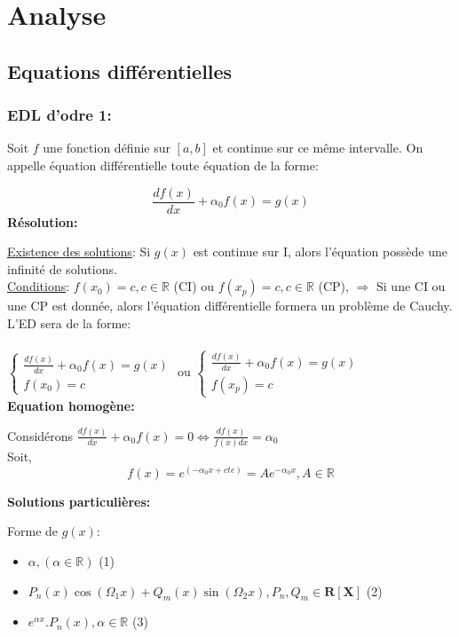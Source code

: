 \section{Analyse}
\subsection{Equations différentielles}

\subsubsection{EDL d'odre 1:}

Soit $f$ une fonction définie sur $[a, b]$ et continue sur ce même intervalle. On appelle équation différentielle toute équation de la forme:

$$
    \frac{df(x)}{dx} + \alpha_0 f(x) = g(x)
$$
\textbf{Résolution:}

\underline{Existence des solutions}: Si $g(x)$ est continue sur I, alors l'équation possède une infinité de solutions.\\

\underline{Conditions}:  $f(x_0)=c, c\in \mathbb{R}$ (CI) ou $f(x_p) = c, c\in \mathbb{R}$ (CP), $\Rightarrow $ Si une CI ou une CP est donnée, alors l'équation différentielle formera un problème de Cauchy.\\
L'ED sera de la forme:\\
\\
$
\left\{
    \begin{array}{ll}
        \frac{df(x)}{dx} +
            \alpha_0 f(x) = g(x) \\
        f(x_0) = c
    \end{array}
\right.
$
ou
 $
\left\{
    \begin{array}{ll}
        \frac{df(x)}{dx} + \alpha_0 f(x) = g(x) \\
        f(x_p) = c
    \end{array}
\right.
$
\\

\textbf{Equation homogène:}

Considérons $\frac{df(x)}{dx} + \alpha_0 f(x) = 0$$\iff$$\frac{df(x)}{f(x) dx} = \alpha_0$\\
Soit, 
$$f(x) = e^{(-\alpha_0 x + cte)} = A e^{-\alpha_0x}, A \in \mathbb{R}$$

\textbf{Solutions particulières:}

Forme de $g(x)$:


\begin{itemize}[label=\textbullet, font=\small]
    \item $\alpha, (\alpha \in \mathbb{R})$ (1)
    \item $P_n(x) \cos (\Omega_1x) + Q_m(x)\sin(\Omega_2x), P_n, Q_m \in \mathbf{R[X]}$ (2)
    \item $e^{\alpha x}. P_n(x), \alpha\in \mathbb{R}$ (3)
\end{itemize}

